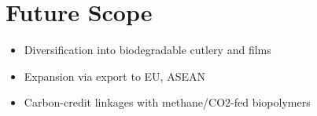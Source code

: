 \section{Future Scope}
\begin{itemize}
    \item Diversification into biodegradable cutlery and films
    \item Expansion via export to EU, ASEAN
    \item Carbon-credit linkages with methane/CO2-fed biopolymers
\end{itemize}